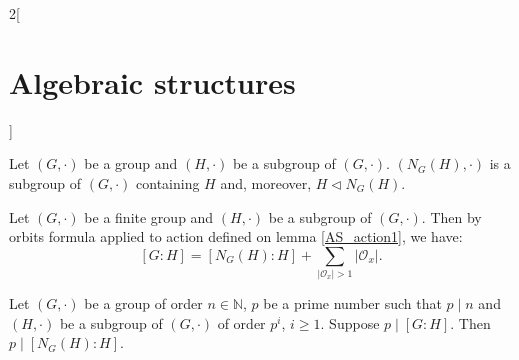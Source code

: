 \documentclass[../../../main.tex]{subfiles}
\begin{document}
\begin{multicols}{2}[\section{Algebraic structures}]
\begin{definition}
\end{definition}
\begin{lemma}
    Let $(G,\cdot)$ be a group and $(H,\cdot)$ be a subgroup of $(G,\cdot)$. $(N_G(H),\cdot)$ is a subgroup of $(G,\cdot)$ containing $H$ and, moreover, $H\lhd N_G(H)$.
\end{lemma}
\begin{corollary}
    Let $(G,\cdot)$ be a finite group and $(H,\cdot)$ be a subgroup of $(G,\cdot)$. Then by orbits formula applied to action defined on lemma \ref{AS_action1}, we have: $$[G:H]=[N_G(H):H]+\sum_{|\mathcal{O}_x|>1}|\mathcal{O}_x|.$$
\end{corollary}
\begin{prop}
    Let $(G,\cdot)$ be a group of order $n\in\mathbb{N}$, $p$ be a prime number such that $p\mid n$ and $(H,\cdot)$ be a subgroup of $(G,\cdot)$ of order $p^i$, $i\geq 1$. Suppose $p\mid[G:H]$. Then $p\mid[N_G(H):H]$.
\end{prop}

\end{multicols}
\end{document}
